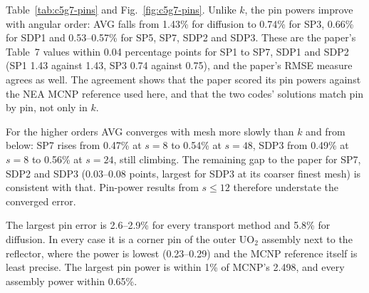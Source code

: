 Table~\ref{tab:c5g7-pins} and Fig.~\ref{fig:c5g7-pins}. Unlike $k$, the pin
powers improve with angular order: AVG falls from 1.43\% for diffusion to
0.74\% for SP3, 0.66\% for SDP1 and 0.53--0.57\% for SP5, SP7, SDP2 and
SDP3. These are the paper's Table~7 values within 0.04 percentage points
for SP1 to SP7, SDP1 and SDP2 (SP1 1.43 against 1.43, SP3 0.74
against 0.75), and the paper's RMSE measure agrees as well. The agreement
shows that the paper scored its pin powers against the NEA MCNP reference
used here, and that the two codes' solutions match pin by pin, not only in
$k$.

For the higher orders AVG converges with mesh more slowly than $k$ and from
below: SP7 rises from 0.47\% at $s = 8$ to 0.54\% at $s = 48$, SDP3 from
0.49\% at $s = 8$ to 0.56\% at $s = 24$, still climbing. The remaining gap
to the paper for SP7, SDP2 and SDP3 (0.03--0.08 points, largest for SDP3 at
its coarser finest mesh) is consistent with that. Pin-power results from
$s \le 12$ therefore understate the converged error.

The largest pin error is 2.6--2.9\% for every transport method and 5.8\% for
diffusion. In every case it is a corner pin of the outer UO$_2$ assembly next
to the reflector, where the power is lowest (0.23--0.29) and the MCNP
reference itself is least precise. The largest pin power is within 1\% of
MCNP's 2.498, and every assembly power within 0.65\%.
